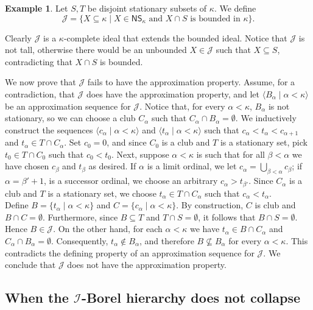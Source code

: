 \documentclass{amsart}
\numberwithin{equation}{section}
\newcommand{\I}{\mathcal{I}}
\newcommand{\J}{\mathcal{J}}
\newcommand{\1}{\mathbf{I}}
\newcommand{\2}{\mathbf{II}}
\renewcommand{\a}{\alpha}
\renewcommand{\b}{\beta}
\renewcommand{\k}{\kappa}
\theoremstyle{definition}
\newtheorem{example}[theorem]{Example}
\theoremstyle{remark}
\begin{document}
\begin{example}\label{messy_counter_example}
   Let $S,T$ be disjoint stationary subsets of \(\kappa\). We define $$\J=\{X\subseteq \kappa \mid X\in \mathsf{NS_\k} \text{ and } X\cap S \text{ is bounded in }\k\}.$$

    Clearly $\J$ is a $\k$-complete ideal that extends the bounded ideal. Notice that $\J$ is not tall, otherwise there would be an unbounded $X\in\J$ such that $X\subseteq S$, contradicting that $X\cap S$ is bounded.

    We now prove that \(\J\) fails to have the approximation property. Assume, for a contradiction, that \(\J\) does have the approximation property, and let \(\langle B_\alpha \mid \alpha<\kappa\rangle\) be an approximation sequence for \(\J\).
   Notice that, for every  $\alpha<\kappa$, $B_\alpha$ is not stationary, so we can choose a club $C_\alpha$ such that $C_\alpha\cap B_\alpha=\emptyset$.
    We inductively construct the sequences $\langle c_\alpha\mid \alpha<\kappa\rangle$ and $\langle t_\alpha\mid \alpha<\kappa\rangle$ such that \(c_\a<t_\a<c_{\a+1}\) and $t_\alpha\in T\cap C_\alpha$. 
    Set \(c_0=0 \), and since $C_0$ is a club and $T$ is a stationary set, pick $t_0 \in T\cap C_0$ such that $c_0<t_0$. 
    Next, suppose $\alpha<\kappa$ is such that for all $\beta<\alpha$ we have chosen $c_\beta$ and $t_\beta$ as desired. If $\alpha$ is a limit ordinal, we let $c_\alpha=\bigcup_{\beta<\alpha}c_\b$; if $\alpha=\b' +1$, is a successor ordinal,  we choose an arbitrary $c_\alpha>t_{\b'}$. Since $C_\alpha$ is a club and $T$ is a stationary set, we choose $t_\alpha\in T\cap C_\alpha$ such that $c_\alpha<t_\alpha$. \\
    Define \(B=\{t_\alpha\mid \alpha<\kappa\}\) and \(C=\{c_\alpha\mid \alpha<\kappa\}\). By construction, \(C\) is club and \(B\cap C=\emptyset\). Furthermore, since \(B\subseteq T\) and \(T\cap S=\emptyset\), it follows that \(B\cap S=\emptyset\). Hence \(B\in \J\). On the other hand, for each \(\alpha<\kappa\) we have \(t_\alpha\in B\cap C_\alpha\) and \(C_\alpha\cap B_\alpha=\emptyset\). Consequently, \(t_\alpha\notin B_\alpha\), and therefore \(B\not\subseteq B_\alpha\) for every \(\alpha<\kappa\). This contradicts the defining property of an approximation sequence for \(\J\). We conclude that \(\J\) does not have the approximation property.
\end{example}


\subsection{When the \(\I\)-Borel hierarchy does not collapse}
\end{document}
